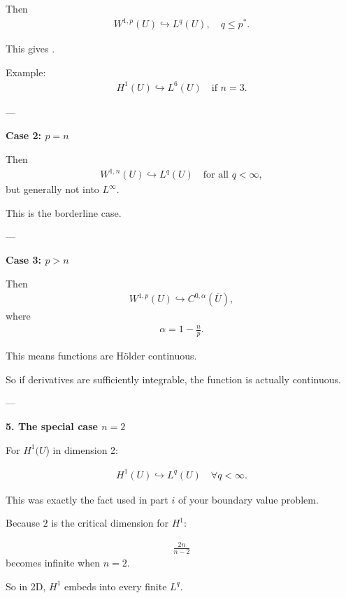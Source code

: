 \documentclass[12pt,a4paper]{report}
\begin{document}
\begin{description}
\begin{description}
\begin{description}
Then
\begin{align*}
W^{1,p}(U)\hookrightarrow L^q(U),\quad q\le p^*.
\end{align*}

This gives .

Example:
\begin{align*}
H^1(U)\hookrightarrow L^6(U)\quad \text{if }n=3.
\end{align*}

---

    \item \textbf{Case 2: $p=n$}

Then
\begin{align*}
W^{1,n}(U)\hookrightarrow L^q(U)\quad \text{for all }q<\infty,
\end{align*}
but generally not into $L^\infty$.

This is the borderline case.

---

    \item \textbf{Case 3: $p>n$}

Then
\begin{align*}
W^{1,p}(U)\hookrightarrow C^{0,\alpha}(\overline U),
\end{align*}
where
\begin{align*}
\alpha=1-\frac np.
\end{align*}

This means functions are Hölder continuous.

So if derivatives are sufficiently integrable, the function is actually continuous.

---
    \end{description}

\item \textbf{5. The special case $n=2$}

For $H^1(U$) in dimension 2:

\begin{align*}
H^1(U)\hookrightarrow L^q(U)\quad \forall q<\infty.
\end{align*}

This was exactly the fact used in part $i$ of your boundary value problem.

Because $2$ is the critical dimension for $H^1$:

\begin{align*}
\frac{2n}{n-2}
\end{align*}
becomes infinite when $n=2$.

So in 2D, $H^1$ embeds into every finite $L^q$.


\end{description}
\end{description}
\end{document}
